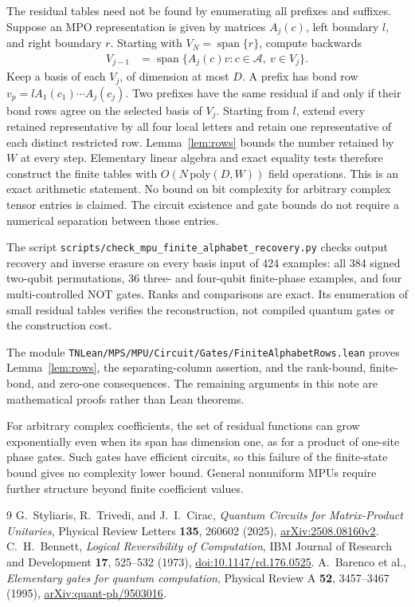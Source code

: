 \documentclass[11pt]{article}
\begin{document}
The residual tables need not be found by enumerating all prefixes and
suffixes. Suppose an MPO representation is given by matrices $A_j(c)$,
left boundary $l$, and right boundary $r$. Starting with $V_N=\operatorname{span}\{r\}$,
compute backwards
\begin{align}
 V_{j-1}&=\operatorname{span}\{A_j(c)v:c\in\mathcal A,\ v\in V_j\}.
 \label{eq:suffix-span}
\end{align}
Keep a basis of each $V_j$, of dimension at most $D$.
A prefix has bond row $v_p=lA_1(c_1)\cdots A_j(c_j)$.
Two prefixes have the same residual if and only if their bond rows agree
on the selected basis of $V_j$. Starting from $l$, extend every retained
representative by all four local letters and retain one representative of
each distinct restricted row. Lemma~\ref{lem:rows} bounds the number retained
by $W$ at every step. Elementary linear algebra and exact equality tests
therefore construct the finite tables with $O(N\,\mathrm{poly}(D,W))$ field
operations. This is an exact arithmetic statement. No bound on bit complexity
for arbitrary complex tensor entries is claimed. The circuit existence and
gate bounds do not require a numerical separation between those entries.

The script \texttt{scripts/check\_mpu\_finite\_alphabet\_recovery.py}
checks output recovery and inverse erasure on every basis input of 424
examples: all 384 signed two-qubit permutations, 36 three- and four-qubit
finite-phase examples, and four multi-controlled NOT gates. Ranks and
comparisons are exact. Its enumeration of small residual tables verifies
the reconstruction, not compiled quantum gates or the construction cost.

The module \texttt{TNLean/MPS/MPU/Circuit/Gates/FiniteAlphabetRows.lean} proves
Lemma~\ref{lem:rows}, the separating-column assertion, and the rank-bound,
finite-bond, and zero-one consequences. The remaining arguments in this note
are mathematical proofs rather than Lean theorems.

For arbitrary complex coefficients, the set of residual functions can grow
exponentially even when its span has dimension one, as for a product of
one-site phase gates. Such gates have efficient circuits, so this failure
of the finite-state bound gives no complexity lower bound. General
nonuniform MPUs require further structure beyond finite coefficient values.

\begin{thebibliography}{9}
G.~Styliaris, R.~Trivedi, and J.~I.~Cirac,
\emph{Quantum Circuits for Matrix-Product Unitaries},
Physical Review Letters \textbf{135}, 260602 (2025),
\href{https://arxiv.org/abs/2508.08160}{arXiv:2508.08160v2}.
C.~H.~Bennett, \emph{Logical Reversibility of Computation},
IBM Journal of Research and Development \textbf{17}, 525--532 (1973),
\href{https://doi.org/10.1147/rd.176.0525}{doi:10.1147/rd.176.0525}.
A.~Barenco et al., \emph{Elementary gates for quantum computation},
Physical Review A \textbf{52}, 3457--3467 (1995),
\href{https://arxiv.org/abs/quant-ph/9503016}{arXiv:quant-ph/9503016}.
\end{thebibliography}
\end{document}
